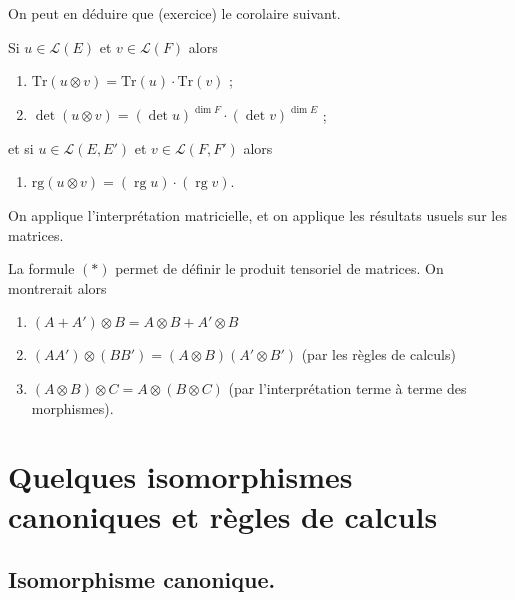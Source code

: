 \documentclass{../../notes}
\begin{document}
  On peut en déduire que (exercice) le corolaire suivant.
  \begin{crlr}
    Si $u \in \mathcal{L}(E)$ et $v \in \mathcal{L}(F)$ alors 
    \begin{enumerate}
      \item $\mathrm{Tr}(u\otimes v) = \mathrm{Tr}(u) \cdot \mathrm{Tr}(v)$ ;
      \item $\det (u \otimes v) = (\det u)^{\operatorname{dim} F} \cdot (\det v)^{\operatorname{dim} E}$ ;
    \end{enumerate}
    et si $u \in \mathcal{L}(E, E')$ et $v \in \mathcal{L}(F, F')$ alors
    \begin{enumerate}[resume*]
      \item $\mathrm{rg}(u\otimes v) = (\operatorname{rg} u) \cdot (\operatorname{rg} v)$.
    \end{enumerate}
  \end{crlr}
  \begin{prv}[Idée]
    On applique l'interprétation matricielle, et on applique les résultats usuels sur les matrices.
  \end{prv}

  \begin{rmk}
    La formule $(*)$ permet de définir le produit tensoriel de matrices.
    On montrerait alors
    \begin{enumerate}
      \item $(A + A') \otimes B = A \otimes B + A' \otimes B$
      \item  $(A A') \otimes (B B') = (A \otimes B)(A' \otimes B')$ (par les règles de calculs)
      \item  $(A \otimes B) \otimes C = A \otimes (B \otimes C)$ (par l'interprétation terme à terme des morphismes).
    \end{enumerate}
  \end{rmk}

  \section{Quelques isomorphismes canoniques et règles de calculs}

  \subsection{Isomorphisme canonique.}
\end{document}
